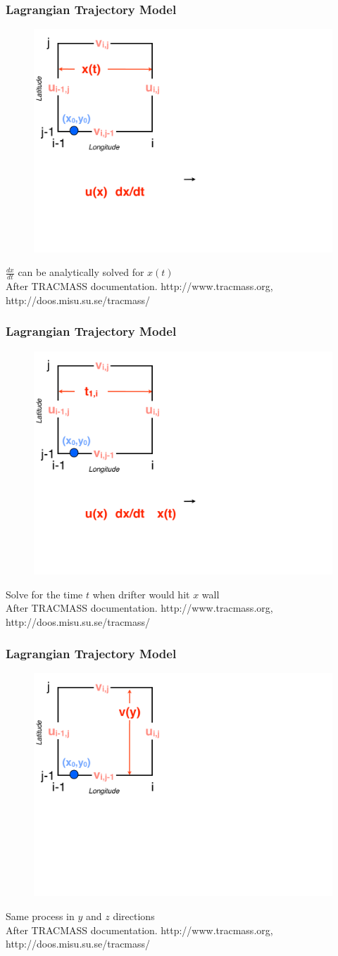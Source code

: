 \documentclass[ignorenonframetext]{beamer}
\begin{document}
\begin{frame}[t,noframenumbering]\frametitle{Lagrangian Trajectory Model}
	\begin{figure}[htbp]
		\centering
		\includegraphics[width=.5\textwidth]{figures/tracmass_box4}
	\end{figure}
	{\Large $\frac{dx}{dt}$ can be analytically solved for $x(t)$}
	\tiny{\\After TRACMASS documentation. http://www.tracmass.org, http://doos.misu.su.se/tracmass/}
\end{frame}
\begin{frame}[t,noframenumbering]\frametitle{Lagrangian Trajectory Model}
	\begin{figure}[htbp]
		\centering
		\includegraphics[width=.5\textwidth]{figures/tracmass_box5}
	\end{figure}
	{\Large Solve for the time $t$ when drifter would hit $x$ wall}
	\tiny{\\After TRACMASS documentation. http://www.tracmass.org, http://doos.misu.su.se/tracmass/}
\end{frame}
\begin{frame}[t,noframenumbering]\frametitle{Lagrangian Trajectory Model}
	\begin{figure}[htbp]
		\centering
		\includegraphics[width=.5\textwidth]{figures/tracmass_box6}
	\end{figure}
	{\Large Same process in $y$ and $z$ directions}
	\tiny{\\After TRACMASS documentation. http://www.tracmass.org, http://doos.misu.su.se/tracmass/}
\end{frame}
\end{document}
